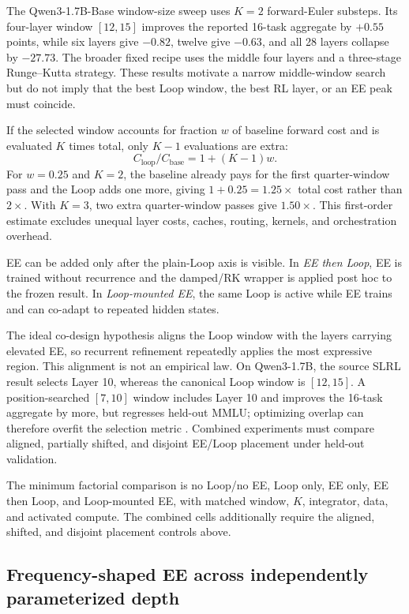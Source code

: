 \documentclass[10pt]{article}
\begin{document}
The Qwen3-1.7B-Base window-size sweep uses $K=2$ forward-Euler substeps.  Its
four-layer window $[12,15]$ improves the reported 16-task aggregate by
$+0.55$ points, while six layers give $-0.82$, twelve give $-0.63$, and all
28 layers collapse by $-27.73$.  The broader fixed recipe uses the middle four
layers and a three-stage Runge--Kutta strategy.  These results motivate a
narrow middle-window search but do not imply that the best Loop window, the
best RL layer, or an EE peak must coincide.

If the selected window accounts for fraction $w$ of baseline forward cost and
is evaluated $K$ times total, only $K-1$ evaluations are extra:
\begin{equation}
 C_{\mathrm{loop}}/C_{\mathrm{base}}=1+(K-1)w.
 \label{eq:loop-cost}
\end{equation}
For $w=0.25$ and $K=2$, the baseline already pays for the first quarter-window
pass and the Loop adds one more, giving $1+0.25=1.25\times$ total cost rather
than $2\times$.  With $K=3$, two extra quarter-window passes give
$1.50\times$.  This first-order estimate excludes unequal layer costs, caches,
routing, kernels, and orchestration overhead.

EE can be added only after the plain-Loop axis is visible.  In \emph{EE then
Loop}, EE is trained without recurrence and the damped/RK wrapper is applied
post hoc to the frozen result.  In \emph{Loop-mounted EE}, the same Loop is
active while EE trains and can co-adapt to repeated hidden states.

The ideal co-design hypothesis aligns the Loop window with the layers carrying
elevated EE, so recurrent refinement repeatedly applies the most expressive
region.  This alignment is not an empirical law.  On Qwen3-1.7B, the source
SLRL result selects Layer 10, whereas the canonical Loop window is $[12,15]$.
A position-searched $[7,10]$ window includes Layer 10 and improves the 16-task
aggregate by more, but regresses held-out MMLU; optimizing overlap can therefore
overfit the selection metric \citep{chen2026looped}.  Combined experiments must compare aligned,
partially shifted, and disjoint EE/Loop placement under held-out validation.

The minimum factorial comparison is no Loop/no EE, Loop only, EE only, EE then
Loop, and Loop-mounted EE, with matched window, $K$, integrator, data, and
activated compute.  The combined cells additionally require the aligned,
shifted, and disjoint placement controls above.

\subsection{Frequency-shaped EE across independently parameterized depth}
\end{document}
